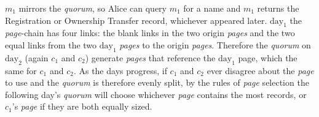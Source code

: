 $ m_{1} $ mirrors the \emph{quorum}, so Alice can query $ m_{1} $ for a name and $ m_{1} $ returns the Registration or Ownership Transfer record, whichever appeared later. $ \textrm{day}_{1} $ the \emph{page}-chain has four links: the blank links in the two origin \emph{pages} and the two equal links from the two $ \textrm{day}_{1} $ \emph{pages} to the origin \emph{pages}. Therefore the \emph{quorum} on $ \textrm{day}_{2} $ (again $ c_{1} $ and $ c_{2} $) generate \emph{pages} that reference the $ \textrm{day}_{1} $ page, which the same for $ c_{1} $ and $ c_{2} $. As the days progress, if $ c_{1} $ and $ c_{2} $ ever disagree about the \emph{page} to use and the \emph{quorum} is therefore evenly split, by the rules of \emph{page} selection the following day's \emph{quorum} will choose whichever \emph{page} contains the most records, or $ c_{1} $'s \emph{page} if they are both equally sized.


